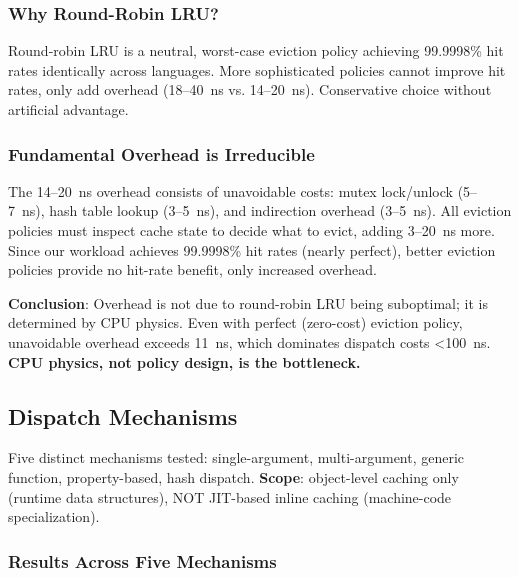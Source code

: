 \documentclass[sigplan,final,acmsmall,review,screen]{acmart}
\begin{document}
\subsubsection{Why Round-Robin LRU?}

Round-robin LRU is a neutral, worst-case eviction policy achieving 99.9998\% hit rates identically across languages. More sophisticated policies cannot improve hit rates, only add overhead (18--40~ns vs. 14--20~ns). Conservative choice without artificial advantage.

\subsubsection{Fundamental Overhead is Irreducible}

The 14--20~ns overhead consists of unavoidable costs: mutex lock/unlock (5--7~ns), hash table
lookup (3--5~ns), and indirection overhead (3--5~ns). All eviction policies must inspect cache
state to decide what to evict, adding 3--20~ns more. Since our workload achieves 99.9998\% hit rates
(nearly perfect), better eviction policies provide no hit-rate benefit, only increased overhead.

\textbf{Conclusion}: Overhead is not due to round-robin LRU being suboptimal; it is determined by
CPU physics. Even with perfect (zero-cost) eviction policy, unavoidable overhead exceeds 11~ns,
which dominates dispatch costs <100~ns. \textbf{CPU physics, not policy design, is the bottleneck.}

\subsection{Dispatch Mechanisms}
\label{sec:dispatch-mechanisms}

Five distinct mechanisms tested: single-argument, multi-argument, generic function, property-based, hash dispatch. \textbf{Scope}: object-level caching only (runtime data structures), NOT JIT-based inline caching (machine-code specialization).

\subsubsection{Results Across Five Mechanisms}
\end{document}
